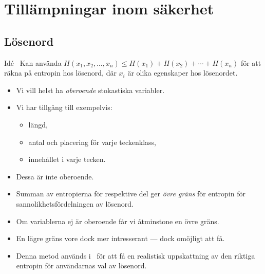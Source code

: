 \documentclass{beamer}
\begin{document}
\section[Tillämpningar]{Tillämpningar inom säkerhet}

\subsection{Lösenord}

\begin{frame}
  \begin{block}{Idé~\cite{Komanduri2011opa}}
    Kan använda \(H(x_1, x_2, \ldots, x_n) \leq H(x_1) + H(x_2) + \cdots 
      + H(x_n)\) för att räkna på entropin hos lösenord, där \(x_i\) är olika 
    egenskaper hos lösenordet.
  \end{block}

  \begin{example}
    \begin{itemize}
      \item Vi vill helst ha \emph{oberoende} stokastiska variabler.

      \item Vi har tillgång till exempelvis:
        \begin{itemize}
          \item längd,
          \item antal och placering för varje teckenklass,
          \item innehållet i varje tecken.
        \end{itemize}

      \item Dessa är inte oberoende.

      \item Summan av entropierna för respektive del ger \emph{övre gräns} för 
        entropin för sannolikhetsfördelningen av lösenord.

    \end{itemize}
  \end{example}
\end{frame}

\begin{frame}
  \begin{remark}
    \begin{itemize}
      \item Om variablerna ej är oberoende får vi åtminstone en övre gräns.

      \item En lägre gräns vore dock mer intresserant --- dock omöjligt att få.

      \item Denna metod används i~\cite{Komanduri2011opa} för att få en 
        realistisk uppskattning av den riktiga entropin för användarnas val av 
        lösenord.

    \end{itemize}
  \end{remark}
\end{frame}
\end{document}
